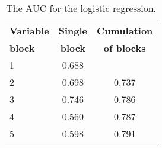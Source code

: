 \begin{table}

\caption{\label{tab:auc-lr}The AUC for the logistic regression.}
\centering
\begin{tabular}[t]{lcc}
\toprule
\textbf{Variable} & \textbf{Single} & \textbf{Cumulation}\\
\textbf{block} & \textbf{block} & \textbf{of blocks}\\
\midrule
1 & 0.688 & \\
2 & 0.698 & 0.737\\
3 & 0.746 & 0.786\\
4 & 0.560 & 0.787\\
5 & 0.598 & 0.791\\
\bottomrule
\end{tabular}
\end{table}

